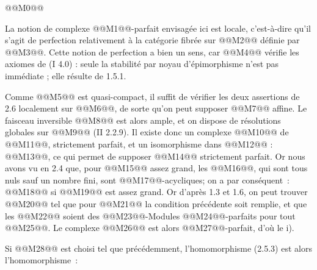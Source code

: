 
@@M0@@

La notion de complexe @@M1@@-parfait envisagée ici est locale, c'est-à-dire qu'il s'agit de perfection relativement à la catégorie fibrée sur @@M2@@ définie par @@M3@@. Cette notion de perfection a bien un sens, car @@M4@@ vérifie les axiomes de (I 4.0) : seule la stabilité par noyau d'épimorphisme n'est pas immédiate ; elle résulte de 1.5.1.

Comme @@M5@@ est quasi-compact, il suffit de vérifier les deux assertions de 2.6 localement sur @@M6@@, de sorte qu'on peut supposer @@M7@@ affine. Le faisceau inversible @@M8@@ est alors ample, et on dispose de résolutions globales sur @@M9@@ (II 2.2.9). Il existe donc un complexe @@M10@@ de @@M11@@, strictement parfait, et un isomorphisme dans @@M12@@ : @@M13@@, ce qui permet de supposer @@M14@@ strictement parfait. Or nous avons vu en 2.4 que, pour @@M15@@ assez grand, les @@M16@@, qui sont tous nuls sauf un nombre fini, sont @@M17@@-acycliques; on a par conséquent~:
@@M18@@
si @@M19@@ est assez grand. Or d'après 1.3 et 1.6, on peut trouver @@M20@@ tel que pour @@M21@@ la condition précédente soit remplie, et que les @@M22@@ soient des @@M23@@-Modules @@M24@@-parfaits pour tout @@M25@@. Le complexe @@M26@@ est alors @@M27@@-parfait, d'où le i).

Si @@M28@@ est choisi tel que précédemment, l'homomorphisme (2.5.3) est alors l'homomorphisme~:
